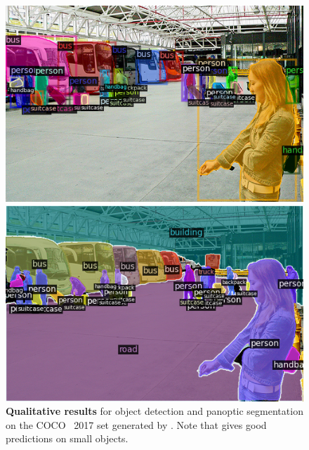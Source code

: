 \begin{figure}[!b]
\begin{minipage}{1\linewidth}
\begin{minipage}[b]{.24\linewidth}
    \includegraphics[width=\linewidth]{vis/success/val_965_det.png}
    \end{minipage}
    \begin{minipage}[b]{.24\linewidth}
    \includegraphics[width=\linewidth]{vis/success/val_965_pan.png}
    \end{minipage}
    
    \end{minipage}
    
    \caption{\textbf{Qualitative results} for object detection and panoptic segmentation on the COCO~\citep{lin2014mscoco} 2017 \val set generated by \ours. Note that \ours gives good predictions on small objects.}
    \label{fig:vis}
    \end{figure}
    
